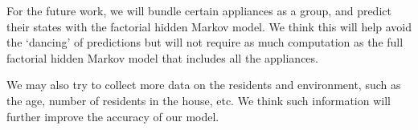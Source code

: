 \documentclass[sigconf]{acmart}
\begin{document}
For the future work, we will bundle certain appliances as a group, and
predict their states with the factorial hidden Markov model. We think
this will help avoid the `dancing' of predictions but will not
require as much computation as the full factorial hidden Markov model
that includes all the appliances.

We may also try to collect more data on the residents and environment,
such as the age, number of residents in the house, etc. We think such
information will further improve the accuracy of our model.



\end{document}

